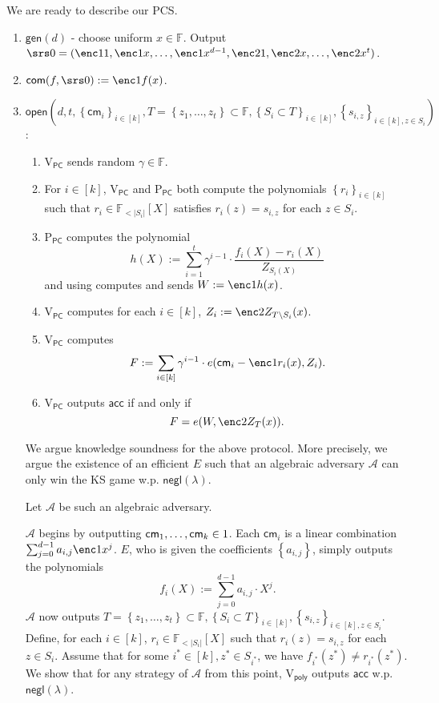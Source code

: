 \documentclass[11pt]{article} %
\newcommand{\F}{\ensuremath{\mathbb F}\xspace}
\newcommand{\adv}{\ensuremath{\mathcal A}\xspace}
\newcommand{\com}{\ensuremath{\mathsf{com}}\xspace}
\newcommand{\cm}{\ensuremath{\mathsf{cm}}\xspace}
\newcommand{\open}{\ensuremath{\mathsf{open}}\xspace}
\newcommand{\negl}{\ensuremath{\mathsf{negl}(\lambda)}\xspace}
\newcommand{\acc}{\ensuremath{\mathsf{acc}}\xspace}
\newcommand{\defeq}{:=}
\newcommand{\sett}[2]{\ensuremath{\set{#1}_{#2}}\xspace}
\newcommand{\gen}{\ensuremath{\mathsf{gen}}\xspace}
\newcommand{\prvpc}{\ensuremath{\mathrm{P_{\mathsf{PC}}}}\xspace}
\newcommand{\verpoly}{\ensuremath{\mathrm{V_{\mathsf{poly}}}}\xspace}
\newcommand{\verpc}{\ensuremath{\mathrm{V_{\mathsf{PC}}}}\xspace}
\newcommand{\ext}{\ensuremath{E}\xspace}
\newcommand{\set}[1]{\ensuremath{\left\{#1\right\}}\xspace}
\newcommand{\polysofdeg}[1]{\ensuremath{\F_{< #1}[X]}\xspace}
\begin{document}
We are ready to describe our PCS.

\begin{enumerate}
 \item $\gen(d)$ - choose uniform $x\in \F$. Output $\srs0 =(\enc1{1},\enc1{x},\ldots,\enc1{x^{d-1}},\enc2{1},\enc2{x},\ldots,\enc2{x^t})$.
 \item $\com(f,\srs0) \defeq \enc1{f(x)}$.
 \item  
 \noindent
 $\open\left(d,t,\sett{\cm_i}{i\in [k]},T=\set{z_1,\ldots,z_t}\subset \F,\sett{S_i\subset T}{i\in [k]},\sett{s_{i,z}}{i\in [k],z\in S_i}\right)$:
 \begin{enumerate}
  \item \verpc sends random $\gamma\in \F$.
  \item For $i\in [k]$, \verpc and \prvpc both compute the polynomials \sett{r_i}{i\in [k]}
  such that $r_i\in \polysofdeg{|S_i|}$ satisfies $r_i(z) = s_{i,z}$ for each $z\in S_i$. 
 \item \prvpc computes the polynomial
 \[h(X)\defeq \sum_{i=1}^t \gamma^{i-1}\cdot \frac{f_i(X)-r_i(X)}{Z_{S_i(X)}}  \]
 and using  computes and sends $W\defeq \enc1{h(x)}$.
 \item\label{step:computeW} \verpc computes for each $i\in [k]$, $Z_i \defeq \enc2{Z_{T\setminus S_i}(x)}$. 
 \item \verpc computes
 \[F\defeq \sum_{i\in [k]} \gamma^{i-1} \cdot e(\cm_i-\enc1{r_i(x)}, Z_i).\]
 \item \verpc outputs \acc if and only if
 \[ F = e(W,\enc2{Z_T(x)}).\]
 \end{enumerate}

 We argue knowledge soundness for the above protocol. More precisely, we argue the existence of an efficient \ext such that an algebraic adversary \adv can only win the KS game w.p. \negl.
 
 
 Let \adv be such an algebraic adversary.
 
 \adv begins by outputting $\cm_1,\ldots,\cm_k\in \G1$.
 Each $\cm_i$ is a linear combination $\sum_{j=0}^{d-1} a_{i,j} \enc1{x^j}$.
 \ext, who is given the coefficients \set{a_{i,j}}, simply outputs the polynomials
 \[f_i(X)\defeq \sum_{j=0}^{d-1} a_{i,j} \cdot X^j.\]
 \adv now outputs $T=\set{z_1,\ldots,z_t}\subset \F,\sett{S_i\subset T}{i\in [k]},\sett{s_{i,z}}{i\in [k],z\in S_i}$.
 Define, for each $i\in [k]$, $r_i\in \polysofdeg{|S_i|}$ such that $r_i(z)= s_{i,z}$ for each $z\in S_i$.
  Assume that for some $i^*\in [k],z^*\in S_{i^*}$, we have $f_{i^*}(z^*)\neq r_{i^*}(z^*)$. We show that for any strategy of \adv from this point, \verpoly outputs \acc w.p. \negl.
 

\end{enumerate}
\end{document}

